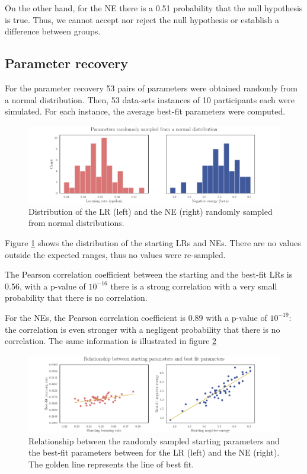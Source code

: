 \documentclass[12pt]{article}
\begin{document}
On the other hand, for the NE there is a 0.51 probability that the null hypothesis is true. Thus, we cannot accept nor reject the null hypothesis or establish a difference between groups.

\subsection{Parameter recovery}

For the parameter recovery 53 pairs of parameters were obtained randomly from a normal distribution. Then, 53 data-sets instances of 10 participants each were simulated. For each instance, the average best-fit parameters were computed.

\begin{figure}[h!]
	\centering
	\hspace*{-0.6in}
	\includegraphics[width=1.15\linewidth]{figures/2.5.0.pdf}
	\caption{Distribution of the LR (left) and the NE (right) randomly sampled from normal distributions.}
	\label{fig:2.5.0}
\end{figure}


Figure \ref{fig:2.5.0} shows the distribution of the starting LRs and NEs. There are no values outside the expected ranges, thus no values were re-sampled.

The Pearson correlation coefficient between the starting and the best-fit LRs is 0.56, with a p-value of $10^{-16}$ there is a strong correlation with a very small probability that there is no correlation.

For the NEs, the Pearson correlation coefficient is 0.89 with a p-value of $10^{-19}$: the correlation is even stronger with a negligent probability that there is no correlation. The same information is illustrated in figure \ref{fig:2.5.1}

\begin{figure}[h!]
	\centering
	\hspace*{-0.6in}
	\includegraphics[width=1.15\linewidth]{figures/2.5.1.pdf}
	\caption{Relationship between the randomly sampled starting parameters and the best-fit parameters between for the LR (left) and the NE (right). The golden line represents the line of best fit.}
	\label{fig:2.5.1}
\end{figure}
\end{document}
